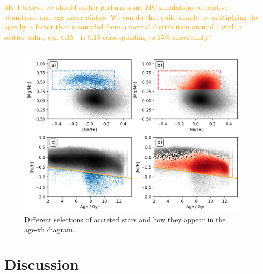 \documentclass[fleqn,usenatbib]{mnras}
\newcommand{\SB}[1]{{\textcolor{orange}{SB: #1}}}
\begin{document}
\SB{I believe we should rather perform some MC simulations of relative abundance and age uncertainties. We can do that quite simple by multiplying the ages by a factor that is sampled from a normal distribution around 1 with a scatter value, e.g. 0.15 - is 0.15 corresponding to 15\% uncertainty?}

\subsection{}

\begin{figure}
	\includegraphics[width=\columnwidth]{figures/NaFe_MgMn_selection_Age_FeH_dissection.png}
    \caption{Different selections of accreted stars and how they appear in the age-xh diagram.}
    \label{fig:NaFe_MgMn_selection_Age_FeH_dissection}
\end{figure}

\section{Discussion} \label{sec:discussion}
\end{document}
